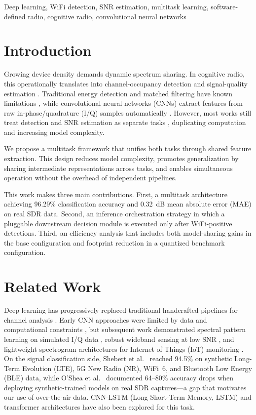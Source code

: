 \documentclass[conference]{IEEEtran}
\begin{document}
\begin{IEEEkeywords}
Deep learning, WiFi detection, SNR estimation, multitask learning, software-defined radio, cognitive radio, convolutional neural networks
\end{IEEEkeywords}

\section{Introduction}

Growing device density demands dynamic spectrum sharing. In cognitive radio, this operationally translates into channel-occupancy detection and signal-quality estimation \cite{li2020deep,kim2020deep,gao2019deep}. Traditional energy detection and matched filtering have known limitations \cite{wang2021spectrum}, while convolutional neural networks (CNNs) extract features from raw in-phase/quadrature (I/Q) samples automatically \cite{zhang2022deep,gao2019deep}. However, most works still treat detection and SNR estimation as separate tasks \cite{chen2021multitask,jeevangi2022deep,li2024multitask}, duplicating computation and increasing model complexity.

We propose a multitask framework that unifies both tasks through shared feature extraction. This design reduces model complexity, promotes generalization by sharing intermediate representations across tasks, and enables simultaneous operation without the overhead of independent pipelines.

This work makes three main contributions. First, a multitask architecture achieving 96.29\% classification accuracy and 0.32~dB mean absolute error (MAE) on real SDR data. Second, an inference orchestration strategy in which a pluggable downstream decision module is executed only after WiFi-positive detections. Third, an efficiency analysis that includes both model-sharing gains in the base configuration and footprint reduction in a quantized benchmark configuration.

\section{Related Work}

Deep learning has progressively replaced traditional handcrafted pipelines for channel analysis \cite{syed2023dnn,gao2019deep,zhang2023review}. Early CNN approaches were limited by data and computational constraints \cite{oshea2016convolutional}, but subsequent work demonstrated spectral pattern learning on simulated I/Q data \cite{gao2019deep}, robust wideband sensing at low SNR \cite{zhang2023robust}, and lightweight spectrogram architectures for Internet of Things (IoT) monitoring \cite{benazzouza2024novel}. On the signal classification side, Shebert et al.~\cite{shebert2021wireless} reached 94.5\% on synthetic Long-Term Evolution (LTE), 5G New Radio (NR), WiFi~6, and Bluetooth Low Energy (BLE) data, while O'Shea et al.~\cite{oshea2018over} documented 64--80\% accuracy drops when deploying synthetic-trained models on real SDR captures—a gap that motivates our use of over-the-air data. CNN-LSTM (Long Short-Term Memory, LSTM) \cite{roh2022deep} and transformer \cite{kumar2023automatic} architectures have also been explored for this task.
\end{document}
